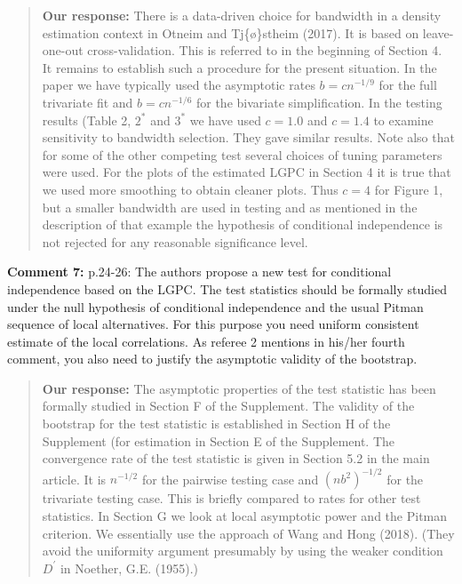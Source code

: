 \documentclass[
  12pt,
  letterpaper]{article}
\numberwithin{equation}{section}
\begin{document}
\begin{quote}
\textbf{Our response:} There is a data-driven choice for bandwidth in a density estimation context in Otneim and Tj\{\o\}stheim (2017). It is based on leave-one-out cross-validation. This is referred to in the beginning of Section 4. It remains to establish such a procedure for the present situation. In the paper we have typically used the asymptotic rates \(b=cn^{-1/9}\) for the full trivariate fit and \(b=cn^{-1/6}\) for the bivariate simplification. In the testing results (Table 2, \(2^*\) and \(3^*\) we have used \(c=1.0\) and \(c=1.4\) to examine sensitivity to bandwidth selection. They gave similar results. Note also that for some of the other competing test several choices of tuning parameters were used. For the plots of the estimated LGPC in Section 4 it is true that we used more smoothing to obtain cleaner plots. Thus \(c=4\) for Figure 1, but a smaller bandwidth are used in testing and as mentioned in the description of that example the hypothesis of conditional independence is not rejected for any reasonable significance level.
\end{quote}

\textbf{Comment 7:} p.24-26: The authors propose a new test for conditional independence based on the LGPC. The test statistics should be formally studied under the null hypothesis of conditional independence and the usual Pitman sequence of local alternatives. For this purpose you need uniform consistent estimate of the local correlations. As referee 2 mentions in his/her fourth comment, you also need to justify the asymptotic validity of the bootstrap.

\begin{quote}
\textbf{Our response:} The asymptotic properties of the test statistic has been formally studied in Section F of the Supplement. The validity of the bootstrap for the test statistic is established in Section H of the Supplement (for estimation in Section E of the Supplement. The convergence rate of the test statistic is given in Section 5.2 in the main article. It is \(n^{-1/2}\) for the pairwise testing case and \((nb^2)^{-1/2}\) for the trivariate testing case. This is briefly compared to rates for other test statistics. In Section G we look at local asymptotic power and the Pitman criterion. We essentially use the approach of Wang and Hong (2018). (They avoid the uniformity argument presumably by using the weaker condition \(D^{\prime}\) in Noether, G.E. (1955).)
\end{quote}
\end{document}
